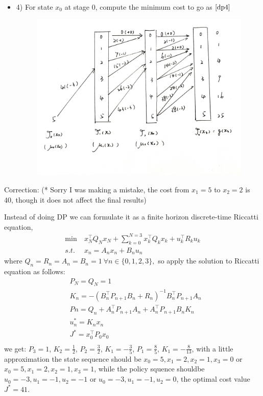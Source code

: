 \documentclass[11pt]{article}
\begin{document}
\begin{itemize}
\begin{itemize}
\begin{figure}[htbp]
      \caption{}
      \label{dp3}
    \end{figure}
    \item 4) For state $x_0$ at stage 0, compute the minimum cost to go as $\ref{dp4}$
    \begin{figure}[htbp]
      \centering
      \includegraphics[width = .58\textwidth]{dp4.jpg}
      \caption{}
      \label{dp4}
    \end{figure} 
  \end{itemize}
  
  Correction: (* Sorry I was making a mistake, the cost from $x_1 = 5$ to $x_2 = 2$ is 40, though it does not affect the final results)

   
Instead of doing DP we can formulate it as a finite horizon discrete-time Riccatti equation, 
\begin{equation}
  \begin{aligned}
  \min \ &x^{\top}_NQ_Nx_N + \sum_{k=0}^{N = 3} x^{\top}_kQ_kx_k + u^{\top}_kR_ku_k  \\
  s.t. \ &x_n = A_n x_n + B_n u_n 
  \end{aligned}
\end{equation}
where $Q_n = R_n = A_n = B_n= 1 \  \forall n \in \{0,1,2,3\},$ so apply the solution to 
Riccatti equation as follows:
\begin{equation}
  \begin{aligned}
  &P_N = Q_N  = 1 \\ \nonumber
  &K_n = -(B_n^{\top} P_{n+1}B_n + R_n)^{-1}B_n^{\top} P_{n+1}A_n \\ \nonumber
  &Pn = Q_n + A^{\top}_n P_{n+1}A_n + A_n^{\top} P_{n+1}B_nK_n \\ \nonumber
  &u^{*}_n = K_n x_n \\ \nonumber
  &J^{*} = x_0^{\top} P_0 x_0    \\ \nonumber
  \end{aligned}
\end{equation}
we get: $P_3 = 1$, $K_2 = \frac{1}{2}$, $P_2 = \frac{3}{2}$, $K_1 = -\frac{3}{5}$, $P_1 = \frac{8}{5}$,
$K_1 = -\frac{8}{13}$, with a little approximation the state sequence should be ${x_0 = 5, x_1 = 2, x_2 = 1, x_3 = 0}$ or ${x_0 = 5, x_1 = 2, x_2 = 1, x_3 = 1}$,
while the policy squence shouldbe ${u_0 = -3, u_1 = -1, u_2 = -1}$ or ${u_0 = -3, u_1 = -1, u_2 = 0}$, the optimal cost value $J^{*} = 41$. 


\end{itemize}
\end{document}
